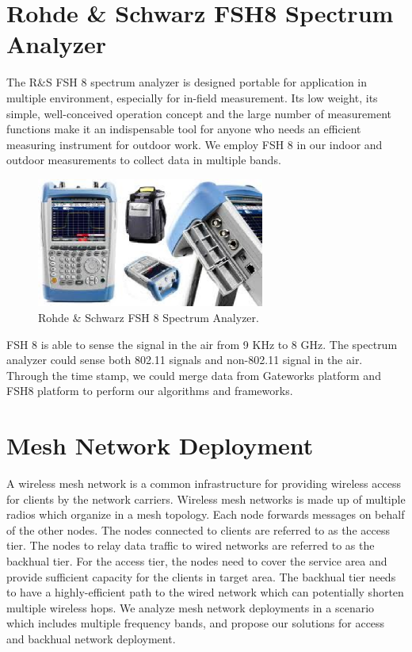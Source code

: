 \section{Rohde \& Schwarz FSH8 Spectrum Analyzer}

The R\&S FSH 8 spectrum analyzer is designed portable for application 
in multiple environment, especially for in-field measurement. Its low 
weight, its simple, well-conceived operation concept and the large number 
of measurement functions make it an indispensable tool for anyone who 
needs an efficient measuring instrument for outdoor work. We employ 
FSH 8 in our indoor and outdoor measurements to collect data in multiple
bands.

\begin{figure} 
\centering
\includegraphics[width=75mm]{figures/fsh8}
\vspace{-0.1in}
\caption{Rohde \& Schwarz FSH 8 Spectrum Analyzer.}
\label{fig:fsh8}
\vspace{0.1in}
\end{figure}

FSH 8 is able to sense the signal in the air from 9 KHz to 
8 GHz. The spectrum analyzer could sense both 802.11 signals 
and non-802.11 signal in the air. Through the time stamp, 
we could merge data from Gateworks platform and FSH8 platform 
to perform our algorithms and frameworks.

\section{Mesh Network Deployment}

A wireless mesh network is a common infrastructure for providing 
wireless access for clients by the network carriers. Wireless 
mesh networks is made up of multiple radios which organize in a mesh 
topology. Each node forwards messages on behalf of the 
other nodes. The nodes connected to clients are referred to as the 
access tier. The nodes to relay data traffic to 
wired networks are referred to as the backhual tier. For the  access tier, the 
nodes need to cover the service area and provide sufficient 
capacity for the clients in target area. The backhual 
tier needs to have a highly-efficient path to the wired 
network which can potentially shorten multiple wireless hops. 
We analyze mesh network deployments in a scenario which includes multiple frequency bands, 
and propose our solutions for access and backhual 
network deployment.


